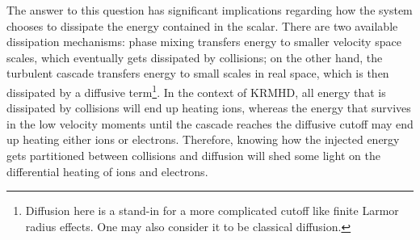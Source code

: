     The answer to this question has significant
    implications regarding how the system chooses to dissipate the energy contained in the
    scalar. There are two available dissipation mechanisms:
    phase mixing transfers energy to smaller
    velocity space scales, which eventually gets dissipated by collisions; on the other
    hand, the turbulent cascade transfers energy to small scales in real
    space, which is then dissipated by a diffusive term\footnote{Diffusion
    here is a stand-in for a more complicated cutoff like 
    finite Larmor radius effects. One may also consider it to be classical diffusion.}. In the context of KRMHD, all energy that is dissipated
    by collisions will end up heating ions, whereas the energy that survives in the low
    velocity moments until the cascade reaches the diffusive cutoff may end up heating
    either ions or electrons. Therefore, knowing how the injected energy gets
    partitioned between collisions and diffusion will shed some
    light on the differential heating of ions and electrons.

